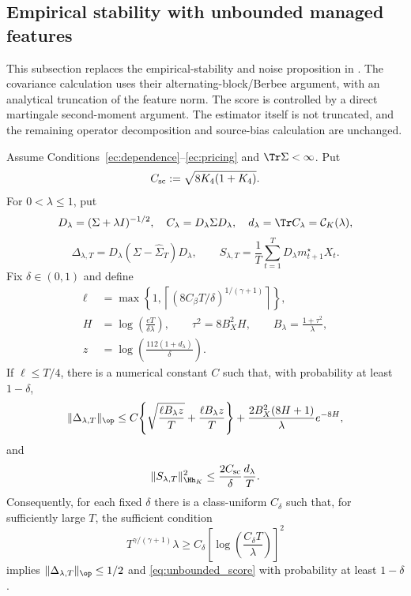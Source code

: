 \subsection{Empirical stability with unbounded managed features}
\label{app:unbounded_concentration}

This subsection replaces the empirical-stability and noise proposition in
\citet{bignozzigagliardinischneider2026}. The covariance calculation uses
their alternating-block/Berbee argument, with an analytical truncation of
the feature norm. The score is controlled by a direct martingale second-moment
argument. The estimator itself is not truncated, and the remaining
operator decomposition and source-bias calculation are unchanged.

\begin{lemma}
\label{lem:unbounded_stability}
Assume Conditions~\ref{ec:dependence}--\ref{ec:pricing} and
$\Tr\Sigma<\infty$. Put
\[
C_{\rm sc}:=\sqrt{8K_4(1+K_4)}.
\]
For $0<\lambda\leq1$, put
\[
D_\lambda=(\Sigma+\lambda I)^{-1/2},\quad
C_\lambda=D_\lambda\Sigma D_\lambda,\quad
 d_\lambda=\Tr C_\lambda=\mathcal C_K(\lambda),
\]
\[
\Delta_{\lambda,T}=D_\lambda(\Sigma-\widehat\Sigma_T)D_\lambda,
\qquad
S_{\lambda,T}=\frac1T\sum_{t=1}^T D_\lambda m^\star_{t+1}X_t.
\]
Fix $\delta\in(0,1)$ and define
\[
\begin{split}
\ell&=\max\!\left\{1,\left\lceil
  (8C_\beta T/\delta)^{1/(\gamma+1)}\right\rceil\right\},\\
H&=\log\!\left(\frac{eT}{\delta\lambda}\right),\qquad
\tau^2=8B_X^2H,\qquad B_\lambda=\frac{1+\tau^2}{\lambda},\\
z&=\log\!\left(\frac{112(1+d_\lambda)}{\delta}\right).
\end{split}
\]
If $\ell\leq T/4$, there is a numerical constant $C$ such that, with
probability at least $1-\delta$,
\begin{equation}
\|\Delta_{\lambda,T}\|_{\op}
\leq C\!\left\{\sqrt{\frac{\ell B_\lambda z}{T}}
                  +\frac{\ell B_\lambda z}{T}\right\}
       +\frac{2B_X^2(8H+1)}{\lambda}e^{-8H},
\label{eq:unbounded_covariance}
\end{equation}
and
\begin{equation}
\|S_{\lambda,T}\|_{\Hh_K}^2
\leq\frac{2C_{\rm sc}}{\delta}\frac{d_\lambda}{T}.
\label{eq:unbounded_score}
\end{equation}
Consequently, for each fixed $\delta$ there is a class-uniform $C_\delta$
such that, for sufficiently large $T$, the sufficient condition
\begin{equation}
T^{\gamma/(\gamma+1)}\lambda
\geq C_\delta\left[\log\!\left(\frac{C_\delta T}{\lambda}\right)\right]^2
\label{eq:unbounded_admissibility}
\end{equation}
implies $\|\Delta_{\lambda,T}\|_{\op}\leq1/2$ and
\eqref{eq:unbounded_score} with probability at least $1-\delta$.
\end{lemma}

